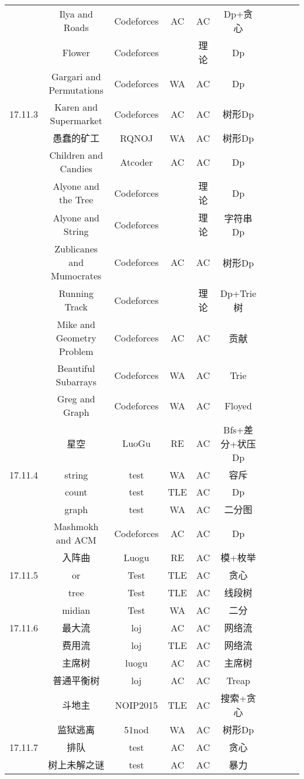 \documentclass[landscape]{article}
\begin{document}
\begin{longtable}{cccccccccc}
  & Ilya and Roads  & Codeforces & AC & AC & Dp+贪心\\
  & Flower & Codeforces & & 理论 & Dp\\
  & Gargari and Permutations & Codeforces & WA & AC & Dp\\
  \hline
  17.11.3 & Karen and Supermarket & Codeforces & AC & AC & 树形Dp\\
  & 愚蠢的矿工 & RQNOJ & WA & AC & 树形Dp\\
  & Children and Candies & Atcoder & AC & AC & Dp\\
  & Alyone and the Tree & Codeforces & & 理论 & Dp\\
  & Alyone and String & Codeforces & & 理论 & 字符串Dp\\
  & Zublicanes and Mumocrates & Codeforces & AC & AC & 树形Dp\\
  & Running Track & Codeforces & & 理论 & Dp+Trie树\\
  & Mike and Geometry Problem & Codeforces & AC & AC & 贡献\\
  & Beautiful Subarrays & Codeforces & WA & AC & Trie\\
  & Greg and Graph & Codeforces & WA & AC & Floyed\\
  & 星空 & LuoGu & RE & AC & Bfs+差分+状压Dp\\
  \hline
  17.11.4 & string & test & WA & AC & 容斥\\
  & count & test & TLE & AC & Dp\\
  & graph & test & WA & AC & 二分图\\
  & Mashmokh and ACM & Codeforces & AC & AC & Dp\\
  & 入阵曲 & Luogu & RE & AC & 模+枚举\\
  \hline
  17.11.5 & or & Test & TLE & AC & 贪心\\
  & tree & Test & TLE & AC & 线段树\\
  & midian & Test & WA & AC & 二分\\
  \hline
  17.11.6 & 最大流 & loj & AC & AC & 网络流\\
  & 费用流 & loj & TLE & AC & 网络流\\
  & 主席树 & luogu & AC & AC & 主席树\\
  & 普通平衡树 & loj & AC & AC & Treap\\
  & 斗地主 & NOIP2015 & TLE & AC & 搜索+贪心\\
  & 监狱逃离 & 51nod & WA & AC & 树形Dp\\
  \hline
  17.11.7 & 排队 & test &  AC & AC & 贪心\\
  & 树上未解之谜 & test & AC & AC & 暴力\\

\end{longtable}
\end{document}
